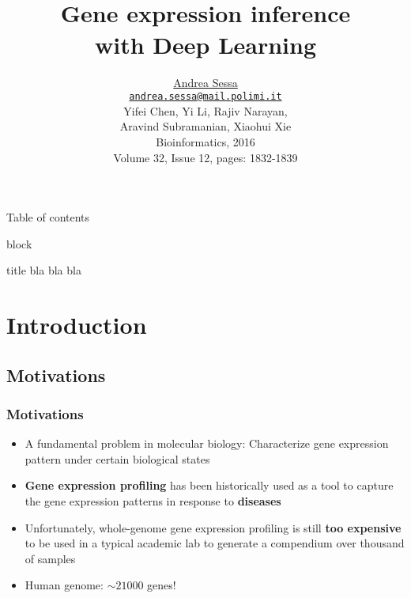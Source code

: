 \documentclass[professionalfont]{beamer}
\title[Gene expression inference with Deep Learning]{\textbf{\\Gene expression inference\\ with Deep Learning}}
\author[A. Sessa]{\underline{Andrea Sessa}\\
\vspace{2mm}
{\small \href{mailto:andrea.sessa@mail.polimi.it}{\nolinkurl{andrea.sessa@mail.polimi.it}}}\\
 \small{Yifei Chen, Yi Li, Rajiv Narayan, \\ Aravind Subramanian, Xiaohui Xie} \\
 \small{Bioinformatics, 2016 \\ Volume 32, Issue 12, pages: 1832-1839}}
\date{}
\begin{document}
  \begin{frame}[plain]
    \titlepage
  \end{frame}

  \begin{frame}{Table of contents}
    \tableofcontents
  \end{frame}

  \begin{frame}{block}
    \begin{block}{title}
      bla bla bla
    \end{block}
  \end{frame}

  \section{Introduction}
  
    \subsection{Motivations}
      \begin{frame}
	\frametitle{Motivations}
	  \begin{itemize}
	   \item A fundamental problem in molecular biology: Characterize gene expression pattern under certain biological states
	   \item \textbf{Gene expression profiling} has been historically used as a tool to capture the gene expression patterns in response to \textbf{diseases}
	   \item Unfortunately, whole-genome gene expression profiling is still \textbf{too expensive} to be used in a typical academic lab to
		 generate a compendium over thousand of samples
           \item Human genome: $\sim 21000$ genes!
	  \end{itemize}
      \end{frame}
\end{document}
